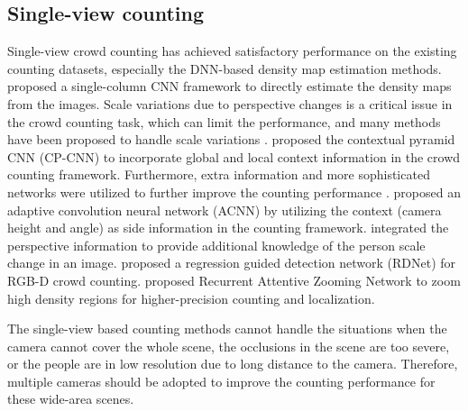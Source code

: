 \documentclass[letterpaper]{article} %
\newcommand{\citep}{\cite}
\newcommand{\citealp}[1]{\citeauthor{#1} \citeyear{#1}}
\begin{document}
\subsection{Single-view counting}
Single-view crowd counting has achieved satisfactory performance on the existing counting datasets, especially the DNN-based density map estimation methods. \citealp{zhang2015cross} proposed a single-column CNN framework to directly estimate the density maps from the images. Scale variations due to perspective changes %
 is a critical issue in the crowd counting task, which can limit the performance, and many %
 methods have been proposed to handle scale variations \citep{boominathan2016crowdnet,zhang2016single,sam2017switching,Kang2018Crowd,onoro2016towards}.
 \citealp{sindagi2017generating} proposed the contextual pyramid CNN (CP-CNN) to incorporate global and local context information in the crowd counting framework. Furthermore, extra information and more sophisticated networks were utilized to further improve the counting performance \citep{idrees2018composition,Wang2019Learning,ranjan2018iterative,cao2018scale,li2018csrnet,liu2018decidenet,shen2018crowd,Jiang2019Crowd,Liu2019Context}.
 \citealp{kang2017incorporating} proposed an adaptive convolution neural network (ACNN) by utilizing the context (camera height and angle) as side information in the counting framework.
 \citealp{shi2019revisiting} integrated the perspective information to provide additional knowledge of the person scale change in an image.
 \citealp{Lian2019Density} proposed a regression guided detection network (RDNet) for RGB-D crowd counting.
 \citealp{Liu2019Recurrent} proposed Recurrent Attentive Zooming Network to zoom high density regions for higher-precision counting and localization.

The single-view based counting methods cannot handle the situations when the camera cannot cover the whole scene,  the occlusions in the scene are too severe, or the people are in low resolution due to long distance to the camera. Therefore, multiple cameras should be adopted to improve the counting performance for these wide-area scenes.
\end{document}
